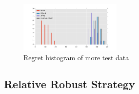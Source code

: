 \documentclass{article}
\begin{document}

    \begin{figure}
       \centering
       \includegraphics[width=0.45\textwidth]{regret.png}
        \caption{Regret histogram of more test data}
        \label{fig:regret}
    \end{figure}

\subsection{Relative Robust Strategy}
\end{document}
